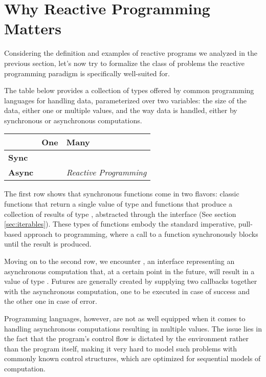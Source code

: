 \section{Why Reactive Programming Matters}

Considering the definition and examples of reactive programs we analyzed in the previous section, let's now try to formalize the class of problems the reactive programming paradigm is specifically well-suited for.

The table below provides a collection of types offered by common programming languages for handling data, parameterized over two variables: the size of the data, either one or multiple values, and the way data is handled, either by synchronous or asynchronous computations\cite{meijer2015spicing}.

\begin{center}
    \begin{tabular}{| l | l | l |}
    \hline
    & \textbf{One} & \textbf{Many} \\ 
    \hline
	\textbf{Sync} & \code{a} & \code{Iterable a} \\ 
	\hline
	\textbf{Async} & \code{Future a} & \textit{Reactive Programming} \\ 
	\hline
    \end{tabular}
\end{center}


The first row shows that synchronous functions come in two flavors: classic functions that return a single value of type  and functions that produce a collection of results of type , abstracted through the  interface (See section \ref{sec:iterables}). These types of functions embody the standard imperative, pull-based approach to programming, where a call to a function synchronously blocks until the result is produced. 

Moving on to the second row, we encounter , an interface representing an asynchronous computation that, at a certain point in the future, will result in a value of type . Futures are generally created by supplying two callbacks together with the asynchronous computation, one to be executed in case of success and the other one in case of error. 

Programming languages, however, are not as well equipped when it comes to handling asynchronous computations resulting in multiple values. The issue lies in the fact that the program's control flow is dictated by the environment rather than the program itself, making it very hard to model such problems with commonly known control structures, which are optimized for sequential models of computation.

